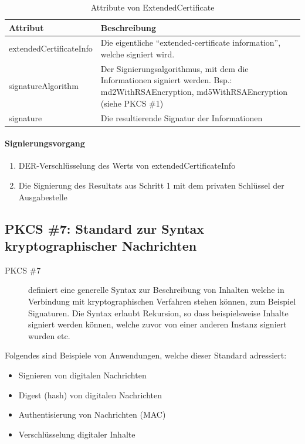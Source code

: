 \documentclass[10pt,a4paper]{article}
\begin{document}
\begin{table}[ht]
    \centering
    \begin{tabular}{|l|p{7.2cm}|} \hline
        \textbf{Attribut} & \textbf{Beschreibung} \\\hline
        extendedCertificateInfo & Die eigentliche "`extended-certificate information"',
            welche signiert wird. \\\hline
        signatureAlgorithm & Der Signierungsalgorithmus, mit dem die Informationen
            signiert werden. Bsp.: md2WithRSAEncryption, md5WithRSAEncryption (siehe PKCS
            \#1) \\\hline
        signature & Die resultierende Signatur der Informationen \\\hline
    \end{tabular}
    \caption{Attribute von ExtendedCertificate}
    \label{tab:ext-cert-attribs}
\end{table}

\paragraph{Signierungsvorgang}
\begin{enumerate}
    \item DER-Verschlüsselung des Werts von extendedCertificateInfo
    \item Die Signierung des Resultats aus Schritt 1 mit dem privaten Schlüssel der
        Ausgabestelle
\end{enumerate}

\subsection{PKCS \#7: Standard zur Syntax kryptographischer Nachrichten}

\begin{description}
    \item[PKCS \#7] definiert eine generelle Syntax zur Beschreibung von Inhalten welche in
        Verbindung mit kryptographischen Verfahren stehen können, zum Beispiel Signaturen.
        Die Syntax erlaubt Rekursion, so dass beispielsweise Inhalte signiert werden
        können, welche zuvor von einer anderen Instanz signiert wurden etc.
\end{description}

Folgendes sind Beispiele von Anwendungen, welche dieser Standard adressiert:
\begin{itemize}
    \item Signieren von digitalen Nachrichten
    \item Digest (hash) von digitalen Nachrichten
    \item Authentisierung von Nachrichten (MAC)
    \item Verschlüsselung digitaler Inhalte
\end{itemize}
\end{document}
